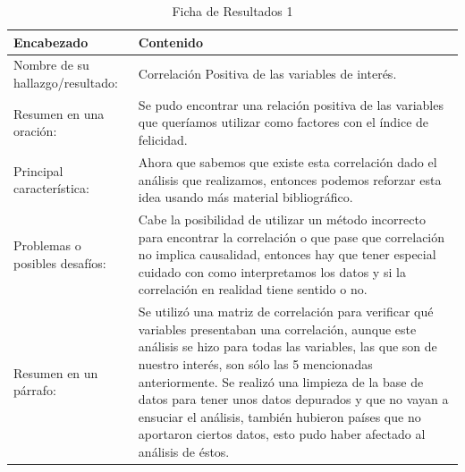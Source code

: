 \begin{table}[H]
    \caption{Ficha de Resultados 1}
    \begin{center}
        \begin{tabular}{  m{3cm} | m{12cm}  }
        \hline\textbf{ Encabezado} & \textbf{Contenido }\\ \hline
        Nombre de su hallazgo/resultado: &  Correlación Positiva de las variables de interés.\\ \hline
        Resumen en una oración: &  Se pudo encontrar una relación positiva de las variables que queríamos utilizar como factores con el índice de felicidad. 
\\ \hline
        Principal característica: &  Ahora que sabemos que existe esta correlación dado el análisis que realizamos, entonces podemos reforzar esta idea usando más material bibliográfico.\\ \hline
        Problemas o posibles desafíos: &  Cabe la posibilidad de utilizar un método incorrecto para encontrar la correlación o que pase que correlación no implica causalidad, entonces hay que tener especial cuidado con como interpretamos los datos y si la correlación en realidad tiene sentido o no. \\ \hline
        Resumen en un párrafo: & Se utilizó una matriz de correlación para verificar qué variables presentaban una correlación, aunque este análisis se hizo para todas las variables, las que son de nuestro interés, son sólo las 5 mencionadas anteriormente. Se realizó una limpieza de la base de datos para tener unos datos depurados y que no vayan a ensuciar el análisis, también hubieron países que no aportaron ciertos datos, esto pudo haber afectado al análisis de éstos. \\ \hline
        \end{tabular}
    \end{center}
\end{table}


